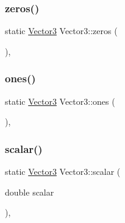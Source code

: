 \mbox{\label{class_vector3_adcaf5345746bf7d0f5da092faf8bf27b}} 
\subsubsection{\texorpdfstring{zeros()}{zeros()}}
{\footnotesize\ttfamily static \mbox{\hyperlink{class_vector3}{Vector3}} Vector3\+::zeros (\begin{DoxyParamCaption}{ }\end{DoxyParamCaption})\hspace{0.3cm}{\ttfamily [inline]}, {\ttfamily [static]}}

\mbox{\label{class_vector3_a7f32f3b57eb6adbec59af6025e6b7778}} 
\subsubsection{\texorpdfstring{ones()}{ones()}}
{\footnotesize\ttfamily static \mbox{\hyperlink{class_vector3}{Vector3}} Vector3\+::ones (\begin{DoxyParamCaption}{ }\end{DoxyParamCaption})\hspace{0.3cm}{\ttfamily [inline]}, {\ttfamily [static]}}

\mbox{\label{class_vector3_af757c4bd03bd4ddfa74c99fd5a3eee94}} 
\subsubsection{\texorpdfstring{scalar()}{scalar()}}
{\footnotesize\ttfamily static \mbox{\hyperlink{class_vector3}{Vector3}} Vector3\+::scalar (\begin{DoxyParamCaption}\item[{double}]{scalar }\end{DoxyParamCaption})\hspace{0.3cm}{\ttfamily [inline]}, {\ttfamily [static]}}

\mbox{\label{class_vector3_ab8c97969179c890acca9f18d457e06e6}} 
